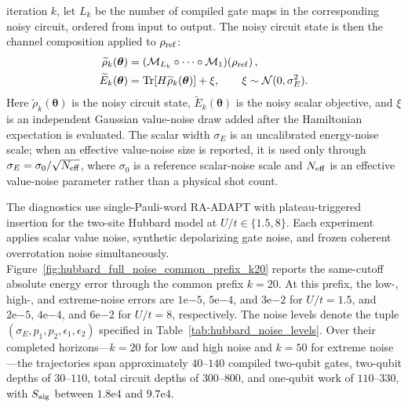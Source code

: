 \documentclass[
  reprint,
  amsmath,
  amssymb,
  aps,
  pra,
  nofootinbib,
  superscriptaddress,
  floatfix
]{revtex4-2}
\begin{document}
iteration \(k\), let \(L_k\) be the number of compiled gate maps in the
corresponding noisy circuit, ordered from input to output. The noisy circuit
state is then the channel composition applied to \(\rho_{\rm ref}\):
\begin{equation*}
\begin{aligned}
\widetilde\rho_k(\boldsymbol{\theta})
&=
\left(\mathcal M_{L_k}\circ\cdots\circ\mathcal M_1\right)
\!\left(\rho_{\rm ref}\right),
\\
\widetilde E_k(\boldsymbol{\theta})
&=
\operatorname{Tr}\!\left[
H\widetilde\rho_k(\boldsymbol{\theta})
\right]
+\xi,
\qquad
\xi\sim\mathcal N(0,\sigma_E^2).
\end{aligned}
\end{equation*}
Here \(\widetilde\rho_k(\boldsymbol{\theta})\) is the noisy circuit state,
\(\widetilde E_k(\boldsymbol{\theta})\) is the noisy scalar objective, and
\(\xi\) is an independent Gaussian value-noise draw added after the Hamiltonian
expectation is evaluated. The scalar width \(\sigma_E\) is an uncalibrated
energy-noise scale; when an effective value-noise size is reported, it is used
only through \(\sigma_E=\sigma_0/\sqrt{N_{\rm eff}}\), where \(\sigma_0\) is a
reference scalar-noise scale and \(N_{\rm eff}\) is an effective value-noise
parameter rather than a physical shot count.

The diagnostics use single-Pauli-word RA-ADAPT with plateau-triggered
insertion for the two-site Hubbard model at \(U/t\in\{1.5,8\}\).  Each
experiment applies scalar value noise, synthetic depolarizing gate noise, and
frozen coherent overrotation noise simultaneously.  Figure~\ref{fig:hubbard_full_noise_common_prefix_k20}
reports the same-cutoff absolute energy error through the common prefix
\(k=20\).  At this prefix, the low-, high-, and extreme-noise errors are
\(1\mathrm{e}{-5}\), \(5\mathrm{e}{-4}\), and \(3\mathrm{e}{-2}\) for
\(U/t=1.5\), and \(2\mathrm{e}{-5}\), \(4\mathrm{e}{-4}\), and
\(6\mathrm{e}{-2}\) for \(U/t=8\), respectively.  The noise levels denote the
tuple \((\sigma_E,p_1,p_2,\epsilon_1,\epsilon_2)\) specified in
Table~\ref{tab:hubbard_noise_levels}.  Over their completed horizons---\(k=20\)
for low and high noise and \(k=50\) for extreme noise---the trajectories span
approximately \(40\)--\(140\) compiled two-qubit gates, two-qubit depths of
\(30\)--\(110\), total circuit depths of \(300\)--\(800\), and one-qubit work
of \(110\)--\(330\), with \(S_{\rm alg}\) between
\(1.8\mathrm{e}4\) and \(9.7\mathrm{e}4\).
\end{document}
